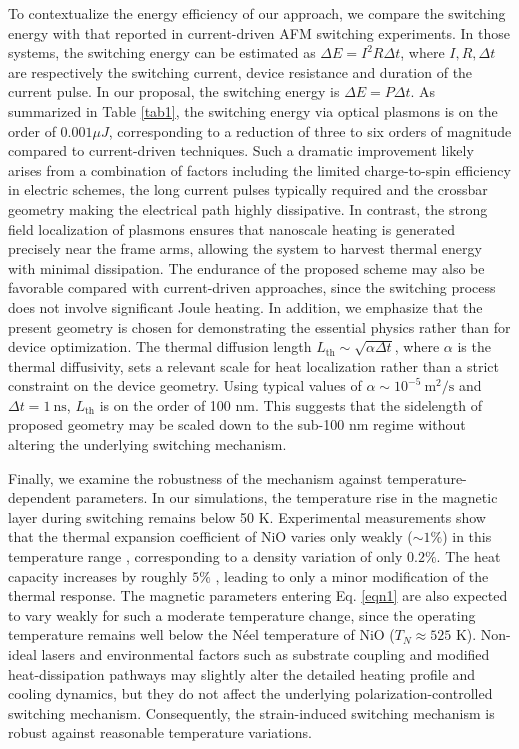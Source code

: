\documentclass[aps,prl,reprint,floatfix,longbibliography,twocolumn]{revtex4-2}
\begin{document}
To contextualize the energy efficiency of our approach, we compare the switching energy with that reported in current-driven AFM switching experiments. In those systems, the switching energy can be estimated as $\Delta E= I^2 R\Delta t$, where $I, R, \Delta t$ are respectively the switching current, device resistance and duration of the current pulse. In our proposal, the switching energy is $\Delta E=P\Delta t$. As summarized in Table \ref{tab1}, the switching energy via optical plasmons is on the order of  $0.001 \mu J$, corresponding to a reduction of three to six orders of magnitude compared to current-driven techniques. Such a dramatic improvement likely arises from a combination of factors including the limited charge-to-spin efficiency in electric schemes, the long current pulses typically required and the crossbar geometry making the electrical path highly dissipative. In contrast, the strong field localization of plasmons ensures that nanoscale heating is generated precisely near the frame arms, allowing the system to harvest thermal energy with minimal dissipation. The endurance of the proposed scheme may also be favorable compared with current-driven approaches, since the switching process does not involve significant Joule heating.
In addition, we emphasize that the present geometry is chosen for demonstrating the essential physics rather than for device optimization. The thermal diffusion length $L_\mathrm{th}\sim \sqrt{\alpha \Delta t}$, where $\alpha$ is the thermal diffusivity, sets a relevant scale for heat localization rather than a strict constraint on the device geometry. Using typical values of $\alpha \sim 10^{-5}~\mathrm{m^2/s}$ \cite{Endmater} and $\Delta t=1~\mathrm{ns}$, $L_\mathrm{th}$ is on the order of 100 nm. This suggests that the sidelength of proposed geometry may be scaled down to the sub-100 nm regime without altering the underlying switching mechanism.

Finally, we examine the robustness of the mechanism against temperature-dependent parameters. In our simulations, the temperature rise in the magnetic layer during switching remains below 50 K. Experimental measurements show that the thermal expansion coefficient of NiO varies only weakly ($\sim 1\%$) in this temperature range \cite{Nielsen1965}, corresponding to a density variation of only $0.2\%$. The heat capacity increases by roughly $5\%$ \cite{Lewis1973}, leading to only a minor modification of the thermal response. The magnetic parameters entering Eq. \eqref{eqn1} are also expected to vary weakly for such a moderate temperature change, since the operating temperature remains well below the Néel temperature of NiO ($T_N \approx 525$ K). Non-ideal lasers and environmental factors such as substrate coupling and modified heat-dissipation pathways may slightly alter the detailed heating profile and cooling dynamics, but they do not affect the underlying polarization-controlled switching mechanism. Consequently, the strain-induced switching mechanism is robust against reasonable temperature variations.
\end{document}

